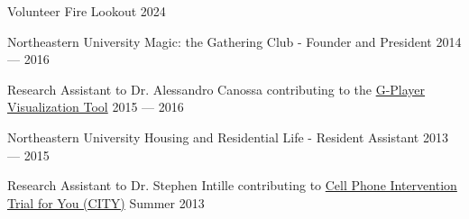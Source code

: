 Volunteer Fire Lookout  \hfill 2024



Northeastern University Magic: the Gathering Club - Founder and President   \hfill 2014 --- 2016

Research Assistant to Dr. Alessandro Canossa contributing to the \href{https://github.com/spacial-player-data-visualization/g-player-visualization}{G-Player Visualization Tool}   \hfill 2015 --- 2016

Northeastern University Housing and Residential Life - Resident Assistant   \hfill 2013 --- 2015

Research Assistant to Dr. Stephen Intille contributing to \href{https://www.mhealthgroup.org/projects.html}{Cell Phone Intervention Trial for You (CITY)}   \hfill Summer 2013


